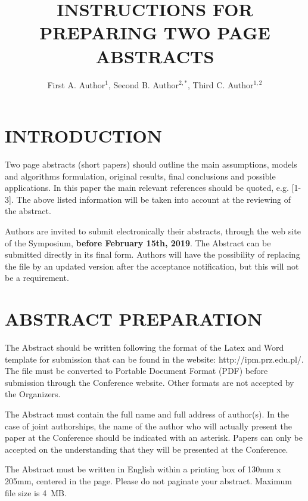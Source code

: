 \documentclass{ShortPaper_Instructions_LaTeX_IPM2019}
\title{INSTRUCTIONS FOR PREPARING TWO PAGE ABSTRACTS}
\author{First A. Author$^1$, Second B. Author$^{2,\ast}$,
Third C. Author$^{1,2}$}
\begin{document}
\section{INTRODUCTION}
\noindent Two page abstracts (short papers) should outline the main assumptions, models and algorithms formulation, original results, final conclusions and possible applications. In this paper the main relevant references should be quoted, e.g. [1-3]. The above listed information will be taken into account at the reviewing of the abstract.

Authors are invited to submit electronically their abstracts, through the web site of the Symposium, \textbf{before February 15th, 2019}. The Abstract can be submitted directly in its final form. Authors will have the possibility of replacing the file by an updated version after the acceptance notification, but this will not be a requirement.

\section{ABSTRACT PREPARATION}
\noindent The Abstract should be written following the format of the Latex and Word template for submission that can be found in the website: http://ipm.prz.edu.pl/. The file must be converted to Portable Document Format (PDF) before submission through the Conference website. Other formats are not accepted by the Organizers.

The Abstract must contain the full name and full address of author(s). In the case of joint authorships, the name of the author who will actually present the paper at the Conference should be indicated with an asterisk. Papers can only be accepted on the understanding that they will be presented at the Conference.

The Abstract must be written in English within a printing box of 130mm x 205mm, centered in the page. Please do not paginate your abstract. Maximum file size is 4~MB.
\end{document}
